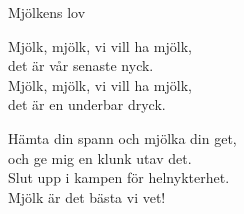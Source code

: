 \begin{song}{Mjölkens lov}
	
	
	
	Mjölk, mjölk, vi vill ha mjölk,\\
	det är vår senaste nyck.\\
	Mjölk, mjölk, vi vill ha mjölk,\\
	det är en underbar dryck.
	
	Hämta din spann och mjölka din get,\\
	och ge mig en klunk utav det.\\
	Slut upp i kampen för helnykterhet.\\
	Mjölk är det bästa vi vet!
	
\end{song}
